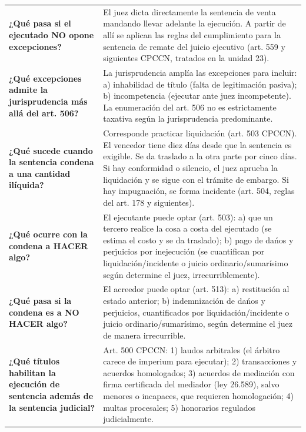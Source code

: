 \documentclass[12pt,oneside]{book}
\begin{document}
\begin{longtable}{
    >{\raggedright\arraybackslash}p{}
    >{\raggedright\arraybackslash}p{}
}
\textbf{¿Qu\'e pasa si el ejecutado NO opone excepciones?} &
El juez dicta directamente la sentencia de venta mandando llevar adelante la ejecuci\'on. A partir de all\'i se aplican las reglas del cumplimiento para la sentencia de remate del juicio ejecutivo (art. 559 y siguientes CPCCN, tratados en la unidad 23). \\

\textbf{¿Qu\'e excepciones admite la jurisprudencia m\'as all\'a del art. 506?} &
La jurisprudencia ampl\'ia las excepciones para incluir: a) inhabilidad de t\'itulo (falta de legitimaci\'on pasiva); b) incompetencia (ejecutar ante juez incompetente). La enumeraci\'on del art. 506 no es estrictamente taxativa seg\'un la jurisprudencia predominante. \\

\textbf{¿Qu\'e sucede cuando la sentencia condena a una cantidad il\'iquida?} &
Corresponde practicar liquidaci\'on (art. 503 CPCCN). El vencedor tiene diez d\'ias desde que la sentencia es exigible. Se da traslado a la otra parte por cinco d\'ias. Si hay conformidad o silencio, el juez aprueba la liquidaci\'on y se sigue con el tr\'amite de embargo. Si hay impugnaci\'on, se forma incidente (art. 504, reglas del art. 178 y siguientes). \\

\textbf{¿Qu\'e ocurre con la condena a HACER algo?} &
El ejecutante puede optar (art. 503): a) que un tercero realice la cosa a costa del ejecutado (se estima el costo y se da traslado); b) pago de da\'nos y perjuicios por inejecuci\'on (se cuantifican por liquidaci\'on/incidente o juicio ordinario/sumar\'isimo seg\'un determine el juez, irrecurriblemente). \\

\textbf{¿Qu\'e pasa si la condena es a NO HACER algo?} &
El acreedor puede optar (art. 513): a) restituci\'on al estado anterior; b) indemnizaci\'on de da\'nos y perjuicios, cuantificados por liquidaci\'on/incidente o juicio ordinario/sumar\'isimo, seg\'un determine el juez de manera irrecurrible. \\

\textbf{¿Qu\'e t\'itulos habilitan la ejecuci\'on de sentencia adem\'as de la sentencia judicial?} &
Art. 500 CPCCN: 1) laudos arbitrales (el \'arbitro carece de imperium para ejecutar); 2) transacciones y acuerdos homologados; 3) acuerdos de mediaci\'on con firma certificada del mediador (ley 26.589), salvo menores o incapaces, que requieren homologaci\'on; 4) multas procesales; 5) honorarios regulados judicialmente. \\


\end{longtable}
\end{document}
